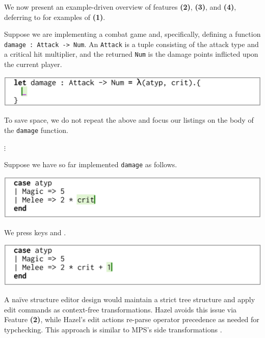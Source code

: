 \documentclass[format=sigplan,dvipsnames,backend=bibtex]{acmart}
\newcommand{\Hazel}{\textsf{Hazel}\xspace}
\newcommand{\key}[1]{\fbox{\texttt{#1}}}
\begin{document}
\newcommand{\feat}[1]{{\bfseries (#1)}}

We now present an example-driven overview of features \feat{2}, \feat{3},
	and \feat{4}, deferring to \cite{Hazelnut} for examples of \feat{1}.

Suppose we are implementing a combat game and, specifically, defining a function
	\texttt{damage : Attack -> Num}. An \texttt{Attack} is a tuple consisting of the
	attack type and a critical hit multiplier, and the returned \texttt{Num} is the
	damage points inflicted upon the current player.
	
{\centering
  \includegraphics[width=\linewidth]{fig/context.png}\par
}
\noindent
To save space, we do not repeat the above and focus our listings on the body of the \texttt{damage} function.

{\centering
	\vspace{-0.1cm}
  $\vdots$\par
  \vspace{0.1cm}
}
\noindent
Suppose we have so far implemented \texttt{damage} as follows.

{\centering
  \includegraphics[width=\linewidth]{fig/frame1.png}\par
}
\noindent
We press keys \key{+} and \key{1}.

{\centering
  \includegraphics[width=\linewidth]{fig/frame2.png}\par
}
\noindent
A naïve structure editor design would maintain a strict tree structure and apply
	edit commands as context-free transformations. \Hazel avoids this issue via
	Feature \feat{2}, while \Hazel's edit actions re-parse operator precedence as
	needed for typchecking. This approach is similar to MPS's side transformations \cite{GrammarCells}.
\end{document}
